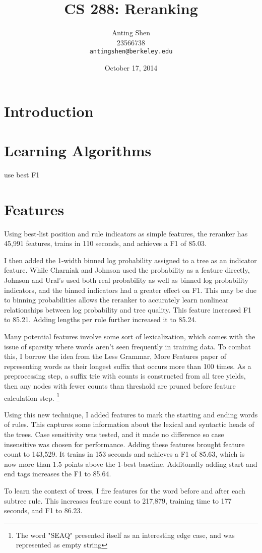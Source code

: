 \documentclass[11pt]{article}
\title{CS 288: Reranking}
\author{Anting Shen \\
  23566738 \\
  {\tt antingshen@berkeley.edu} \\
}
\date{October 17, 2014}
\begin{document}
\maketitle

\section{Introduction}


\section{Learning Algorithms}

use best F1


\section{Features}

Using best-list position and rule indicators as simple features, the reranker has 45,991 features,
trains in 110 seconds, and achieves a F1 of 85.03.

I then added the 1-width binned log probability assigned to a tree as an indicator feature.
While Charniak and Johnson used the probability as a feature directly,
Johnson and Ural's used both real probability as well as binned log probability indicators,
and the binned indicators had a greater effect on F1. This may be due to binning probabilities
allows the reranker to accurately learn nonlinear relationships between log probability and tree quality.
This feature increased F1 to 85.21. Adding lengths per rule further increased it to 85.24.

Many potential features involve some sort of lexicalization, which comes with the issue of sparsity
where words aren't seen frequently in training data. To combat this, I borrow the idea from the
Less Grammar, More Features paper of representing words as their longest suffix that occurs more
than 100 times. As a preprocessing step, a suffix trie with counts is constructed from
all tree yields, then any nodes with fewer counts than threshold are pruned before feature calculation step.
\footnote{The word "SEAQ" presented itself as an interesting edge case, and was represented
as empty string}

Using this new technique, I added features to mark the starting and ending words of rules.
This captures some information about the lexical and syntactic heads of the trees.
Case sensitivity was tested, and it made no difference so case insensitive was chosen for performance.
Adding these features brought feature count to 143,529. It trains in 153 seconds
and achieves a F1 of 85.63, which is now more than 1.5 points above the 1-best baseline.
Additonally adding start and end tags increases the F1 to 85.64.

To learn the context of trees, I fire features for the word before and after each subtree rule.
This increases feature count to 217,879, training time to 177 seconds, and F1 to 86.23.
\end{document}
